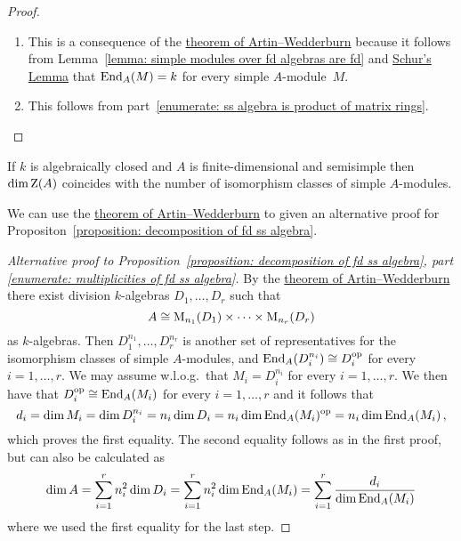 \begin{proof}
  \leavevmode
  \begin{enumerate}
    \item
      This is a consequence of the \hyperref[theorem: artin wedderburn theorem]{theorem of Artin--Wedderburn} because it follows from Lemma~\ref{lemma: simple modules over fd algebras are fd} and \hyperref[proposition: schurs lemma for modules]{Schur’s Lemma} that $\operatorname{End}_A(M) = k$ for every simple $A$-module~$M$.
    \item
      This follows from part~\ref*{enumerate: ss algebra is product of matrix rings}.
    \qedhere
  \end{enumerate}
\end{proof}


\begin{corollary}
  \label{corollary: dimension of center is number of simple modules}
  If $k$ is algebraically closed and $A$ is finite-dimensional and semisimple then $\dim \operatorname{Z}(A)$ coincides with the number of isomorphism classes of simple $A$-modules.
\end{corollary}




\begin{fluff}
  We can use the \hyperref[theorem: artin wedderburn theorem]{theorem of Artin--Wedderburn} to given an alternative proof for Propositon~\ref{proposition: decomposition of fd ss algebra}.
\end{fluff}


\begin{proof}[Alternative proof to Proposition~\ref*{proposition: decomposition of fd ss algebra}, part \ref*{enumerate: multiplicities of fd ss algebra}]
  By the \hyperref[theorem: artin wedderburn theorem]{theorem of Artin--Wedderburn} there exist division $k$-algebras $D_1, \dotsc, D_r$ such that
  \[
          A
    \cong \operatorname{M}_{n_1}(D_1) \times \dotsb \times \operatorname{M}_{n_r}(D_r)
  \]
  as $k$-algebras.
  Then $D_1^{n_1}, \dotsc, D_r^{n_r}$ is another set of representatives for the isomorphism classes of simple $A$-modules, and $\operatorname{End}_A(D_i^{n_i}) \cong D_i^{\operatorname{op}}$ for every $i = 1, \dotsc, r$.
  We may assume w.l.o.g.\ that $M_i = D_i^{n_i}$ for every $i = 1, \dotsc, r$.
  We then have that $D_i^{\operatorname{op}} \cong \operatorname{End}_A(M_i)$ for every $i = 1, \dotsc, r$ and it follows that
  \[
      d_i
    = \dim M_i
    = \dim D_i^{n_i}
    = n_i \dim D_i
    = n_i \dim \operatorname{End}_A(M_i)^{\operatorname{op}}
    = n_i \dim \operatorname{End}_A(M_i) \,,
  \]
  which proves the first equality.
  The second equality follows as in the first proof, but can also be calculated as
  \[
      \dim A
    = \sum_{i=1}^r n_i^2 \dim D_i
    = \sum_{i=1}^r n_i^2 \dim \operatorname{End}_A(M_i)
    = \sum_{i=1}^r \frac{d_i}{\dim \operatorname{End}_A(M_i)}
  \]
  where we used the first equality for the last step.
\end{proof}


